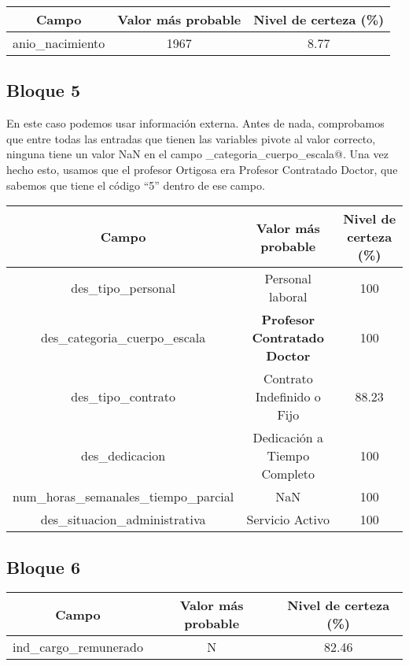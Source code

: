 \documentclass[11pt]{article}
\begin{document}
\begin{table}[h!]
  \centering
  \begin{tabular}{c|c|c}
    Campo & Valor más probable & Nivel de certeza (\%)\\
    \hline
    anio\_nacimiento& 1967 & 8.77\\
  \end{tabular}
\end{table}

\subsection{Bloque 5}
En este caso podemos usar información externa. Antes de nada, comprobamos que entre todas las entradas que tienen las variables pivote al valor correcto, ninguna tiene un valor NaN en el campo \verb@cod_categoria_cuerpo_escala@. Una vez hecho esto, usamos que el profesor Ortigosa era Profesor Contratado Doctor, que sabemos que tiene el código ``5'' dentro de ese campo.

\begin{table}[h!]
  \centering
  \begin{tabular}{c|c|c}
    Campo & Valor más probable & Nivel de certeza (\%)\\
    \hline
    des\_tipo\_personal& Personal laboral & 100\\
    des\_categoria\_cuerpo\_escala & \textbf{Profesor Contratado Doctor} & 100\\
    des\_tipo\_contrato & Contrato Indefinido o Fijo & 88.23\\
    des\_dedicacion & Dedicación a Tiempo Completo & 100\\
    num\_horas\_semanales\_tiempo\_parcial & NaN & 100\\
    des\_situacion\_administrativa & Servicio Activo & 100

  \end{tabular}
\end{table}

\subsection{Bloque 6}

\begin{table}[h!]
  \centering
  \begin{tabular}{c|c|c}
    Campo & Valor más probable & Nivel de certeza (\%)\\
    \hline
    ind\_cargo\_remunerado& N & 82.46

  \end{tabular}
\end{table}
\end{document}
